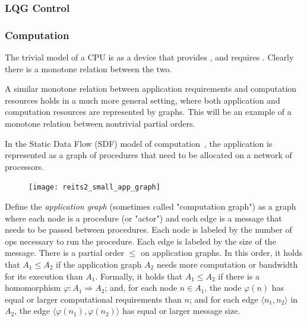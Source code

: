\begin{figure}[h]
\caption{}
\end{figure}
 

\subsubsection{LQG Control}




\subsubsection{Computation}
 

The trivial model of a CPU is as a device that provides , and requires . Clearly there
is a monotone relation between the two.

\begin{figure}[h]
    \begin{center}
    \end{center}
    \caption{}
    \end{figure}
    
A similar monotone relation between application requirements and computation
resources holds in a much more general setting, where both application
and computation resources are represented by graphs. This will be
an example of a monotone relation between nontrivial partial orders.

In the Static Data Flow (SDF) model of computation~\cite[Chapter 3]{sriram00,lee10},
the application is represented as a graph of procedures that need
to be allocated on a network of processors.

\begin{figure}
\texttt{[image: reits2\_small\_app\_graph]}
\end{figure}

Define the\emph{ application graph }(sometimes called "computation
graph") as a graph where each node is a procedure (or "actor")
and each edge is a message that needs to be passed between procedures.
Each node is labeled by the number of ops necessary to run the procedure.
Each edge is labeled by the size of the message. There is a partial
order $ \leq$ on application graphs. In this order, it holds that $A_1 \leq A_2$
if the application graph $A_2$ needs more computation or bandwidth
for its execution than $A_1$. Formally, it holds that $A_1 \leq A_2$
if there is a homomorphism $\varphi:A_1  \Rightarrow A_2$; and,
for each node $n \in A_1$, the node $\varphi(n)$ has equal or
larger computational requirements than $n$; and for each edge $⟨n_1,n_2⟩ $
in $A_2$, the edge $⟨\varphi(n_1),\varphi(n_2)⟩ $
has equal or larger message size.

